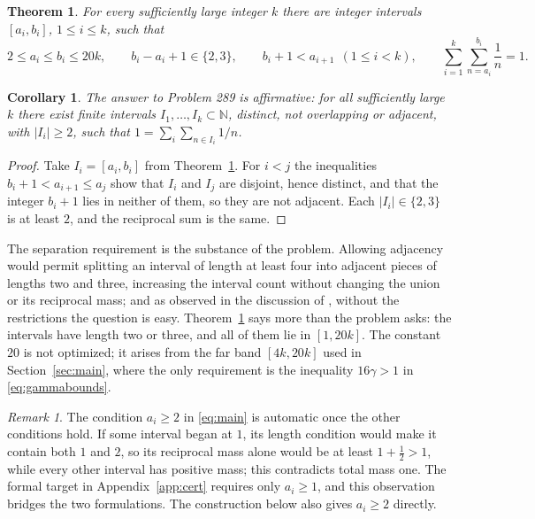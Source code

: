 \documentclass[11pt,letterpaper]{article}
\numberwithin{equation}{section}
\theoremstyle{plain}
\newtheorem{theorem}{Theorem}
\newtheorem{corollary}{Corollary}
\theoremstyle{remark}
\newtheorem{remark}{Remark}
\newcommand{\N}{\mathbb N}
\begin{document}
\begin{theorem}\label{thm:main}
For every sufficiently large integer $k$ there are integer intervals $[a_i,b_i]$, $1\le i\le k$, such that
\begin{equation}\label{eq:main}
2\le a_i\le b_i\le20k,\qquad b_i-a_i+1\in\{2,3\},\qquad
b_i+1<a_{i+1}\ \ (1\le i<k),\qquad
\sum_{i=1}^k\sum_{n=a_i}^{b_i}\frac1n=1 .
\end{equation}
\end{theorem}

\begin{corollary}\label{cor:289}
The answer to Problem 289 is affirmative: for all sufficiently large $k$ there exist finite intervals $I_1,\ldots,I_k\subset\N$, distinct, not overlapping or adjacent, with $|I_i|\ge2$, such that $1=\sum_i\sum_{n\in I_i}1/n$.
\end{corollary}

\begin{proof}
Take $I_i=[a_i,b_i]$ from Theorem~\ref{thm:main}. For $i<j$ the inequalities $b_i+1<a_{i+1}\le a_j$ show that $I_i$ and $I_j$ are disjoint, hence distinct, and that the integer $b_i+1$ lies in neither of them, so they are not adjacent. Each $|I_i|\in\{2,3\}$ is at least $2$, and the reciprocal sum is the same.
\end{proof}

The separation requirement is the substance of the problem. Allowing adjacency would permit splitting an interval of length at least four into adjacent pieces of lengths two and three, increasing the interval count without changing the union or its reciprocal mass; and as observed in the discussion of \cite{EP289}, without the restrictions the question is easy. Theorem~\ref{thm:main} says more than the problem asks: the intervals have length two or three, and all of them lie in $[1,20k]$. The constant $20$ is not optimized; it arises from the far band $[4k,20k]$ used in Section~\ref{sec:main}, where the only requirement is the inequality $16\gamma>1$ in \eqref{eq:gammabounds}.

\begin{remark}\label{rem:two}
The condition $a_i\ge2$ in \eqref{eq:main} is automatic once the other conditions hold. If some interval began at $1$, its length condition would make it contain both $1$ and $2$, so its reciprocal mass alone would be at least $1+\tfrac12>1$, while every other interval has positive mass; this contradicts total mass one. The formal target in Appendix~\ref{app:cert} requires only $a_i\ge1$, and this observation bridges the two formulations. The construction below also gives $a_i\ge2$ directly.
\end{remark}
\end{document}
